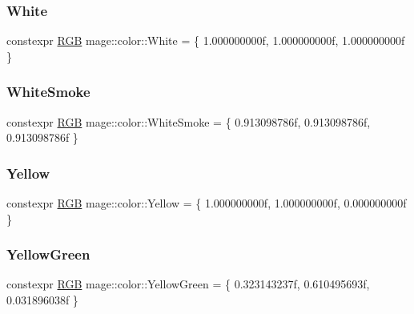 \mbox{\label{namespacemage_1_1color_a39aae61faf172a41b44e2d308e1e4da6}} 
\subsubsection{\texorpdfstring{White}{White}}
{\footnotesize\ttfamily constexpr \mbox{\hyperlink{structmage_1_1_r_g_b}{R\+GB}} mage\+::color\+::\+White = \{ 1.\+000000000f, 1.\+000000000f, 1.\+000000000f \}}

\mbox{\label{namespacemage_1_1color_ad44d164eafa183126c9287e9a0d1d97d}} 
\subsubsection{\texorpdfstring{White\+Smoke}{WhiteSmoke}}
{\footnotesize\ttfamily constexpr \mbox{\hyperlink{structmage_1_1_r_g_b}{R\+GB}} mage\+::color\+::\+White\+Smoke = \{ 0.\+913098786f, 0.\+913098786f, 0.\+913098786f \}}

\mbox{\label{namespacemage_1_1color_a4b2488da6699545c05afaf136a5315e5}} 
\subsubsection{\texorpdfstring{Yellow}{Yellow}}
{\footnotesize\ttfamily constexpr \mbox{\hyperlink{structmage_1_1_r_g_b}{R\+GB}} mage\+::color\+::\+Yellow = \{ 1.\+000000000f, 1.\+000000000f, 0.\+000000000f \}}

\mbox{\label{namespacemage_1_1color_a72c9b049fd1448d89ff65a5e9cabe044}} 
\subsubsection{\texorpdfstring{Yellow\+Green}{YellowGreen}}
{\footnotesize\ttfamily constexpr \mbox{\hyperlink{structmage_1_1_r_g_b}{R\+GB}} mage\+::color\+::\+Yellow\+Green = \{ 0.\+323143237f, 0.\+610495693f, 0.\+031896038f \}}

